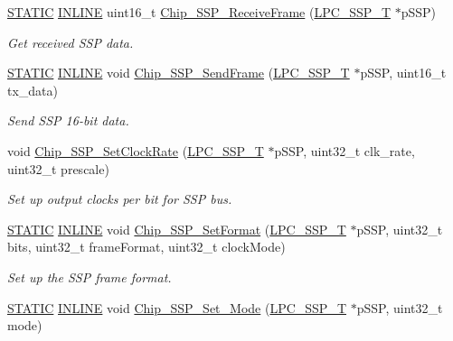 \begin{DoxyCompactItemize}
\hyperlink{group___l_p_c___types___public___macros_ga10b2d890d871e1489bb02b7e70d9bdfb}{S\+T\+A\+T\+IC} \hyperlink{spifi__18xx__43xx_8h_a2eb6f9e0395b47b8d5e3eeae4fe0c116}{I\+N\+L\+I\+NE} uint16\+\_\+t \hyperlink{group___s_s_p__18_x_x__43_x_x_ga7da053acf90aff24ca59bdf673207aac}{Chip\+\_\+\+S\+S\+P\+\_\+\+Receive\+Frame} (\hyperlink{struct_l_p_c___s_s_p___t}{L\+P\+C\+\_\+\+S\+S\+P\+\_\+T} $\ast$p\+S\+SP)
\begin{DoxyCompactList}\small\item\em Get received S\+SP data. \end{DoxyCompactList}\item 
\hyperlink{group___l_p_c___types___public___macros_ga10b2d890d871e1489bb02b7e70d9bdfb}{S\+T\+A\+T\+IC} \hyperlink{spifi__18xx__43xx_8h_a2eb6f9e0395b47b8d5e3eeae4fe0c116}{I\+N\+L\+I\+NE} void \hyperlink{group___s_s_p__18_x_x__43_x_x_gab01849b80cad7f46924a04346560006c}{Chip\+\_\+\+S\+S\+P\+\_\+\+Send\+Frame} (\hyperlink{struct_l_p_c___s_s_p___t}{L\+P\+C\+\_\+\+S\+S\+P\+\_\+T} $\ast$p\+S\+SP, uint16\+\_\+t tx\+\_\+data)
\begin{DoxyCompactList}\small\item\em Send S\+SP 16-\/bit data. \end{DoxyCompactList}\item 
void \hyperlink{group___s_s_p__18_x_x__43_x_x_ga49832a18e0618a82afd66caa6f868445}{Chip\+\_\+\+S\+S\+P\+\_\+\+Set\+Clock\+Rate} (\hyperlink{struct_l_p_c___s_s_p___t}{L\+P\+C\+\_\+\+S\+S\+P\+\_\+T} $\ast$p\+S\+SP, uint32\+\_\+t clk\+\_\+rate, uint32\+\_\+t prescale)
\begin{DoxyCompactList}\small\item\em Set up output clocks per bit for S\+SP bus. \end{DoxyCompactList}\item 
\hyperlink{group___l_p_c___types___public___macros_ga10b2d890d871e1489bb02b7e70d9bdfb}{S\+T\+A\+T\+IC} \hyperlink{spifi__18xx__43xx_8h_a2eb6f9e0395b47b8d5e3eeae4fe0c116}{I\+N\+L\+I\+NE} void \hyperlink{group___s_s_p__18_x_x__43_x_x_ga381ba3a6b470b2c84468b88deed8ac18}{Chip\+\_\+\+S\+S\+P\+\_\+\+Set\+Format} (\hyperlink{struct_l_p_c___s_s_p___t}{L\+P\+C\+\_\+\+S\+S\+P\+\_\+T} $\ast$p\+S\+SP, uint32\+\_\+t bits, uint32\+\_\+t frame\+Format, uint32\+\_\+t clock\+Mode)
\begin{DoxyCompactList}\small\item\em Set up the S\+SP frame format. \end{DoxyCompactList}\item 
\hyperlink{group___l_p_c___types___public___macros_ga10b2d890d871e1489bb02b7e70d9bdfb}{S\+T\+A\+T\+IC} \hyperlink{spifi__18xx__43xx_8h_a2eb6f9e0395b47b8d5e3eeae4fe0c116}{I\+N\+L\+I\+NE} void \hyperlink{group___s_s_p__18_x_x__43_x_x_ga9b5a23b5030facdb75c3ed06d5e86172}{Chip\+\_\+\+S\+S\+P\+\_\+\+Set\+\_\+\+Mode} (\hyperlink{struct_l_p_c___s_s_p___t}{L\+P\+C\+\_\+\+S\+S\+P\+\_\+T} $\ast$p\+S\+SP, uint32\+\_\+t mode)

\end{DoxyCompactItemize}
